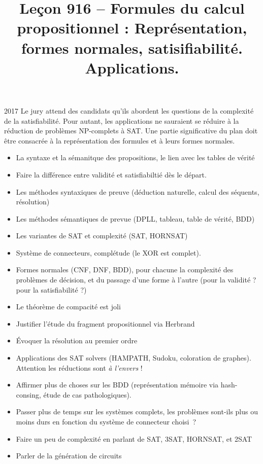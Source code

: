 \documentclass{agregfiche}
\title{Leçon 916 -- Formules du calcul propositionnel : Représentation, formes
normales, satisifiabilité. Applications.}
\begin{document}
\maketitle

\secrapports

\begin{rapport}{2017}
    Le jury attend des candidats qu’ils abordent les questions de la complexité de la satisfiabilité. Pour autant, les applications ne sauraient se réduire à la réduction de problèmes NP-complets à SAT. Une partie significative du plan doit être consacrée à la représentation des formules et à leurs formes normales.
\end{rapport}

\secindispensables

\begin{itemize}
    \item La syntaxe et la sémanitque des propositions,
        le lien avec les tables de vérité
    \item Faire la différence entre validité et satisfiabiltié dès le départ.
    \item Les méthodes syntaxiques de preuve (déduction naturelle,
        calcul des séquents, résolution)
    \item Les méthodes sémantiques de prevue (DPLL, tableau, 
        table de vérité, BDD)
    \item Les variantes de SAT et complexité
        (SAT, HORNSAT)
    \item Système de connecteurs, complétude (le XOR est complet).
    \item Formes normales (CNF, DNF, BDD),
        pour chacune la complexité des problèmes de décision, 
        et du passage d'une forme à l'autre (pour la validité ? pour la
        satisfiabilité ?)
\end{itemize}

\secidees

\begin{itemize}
    \item Le théorème de compacité est joli
    \item Justifier l'étude du fragment propositionnel 
        via Herbrand
    \item Évoquer la résolution au premier ordre
    \item Applications des SAT solvers 
        (HAMPATH, Sudoku, coloration de graphes). Attention les réductions sont \emph{à l'envers} !
    \item Affirmer plus de choses sur les BDD (représentation mémoire
        via hash-consing,
        étude de cas pathologiques).
    \item Passer plus de temps sur les systèmes complets, les problèmes sont-ils 
        plus ou moins durs en fonction du système de connecteur choisi~?
    \item Faire un peu de complexité en parlant de SAT, 3SAT, HORNSAT, et 2SAT
    \item Parler de la génération de circuits
\end{itemize}
\end{document}
